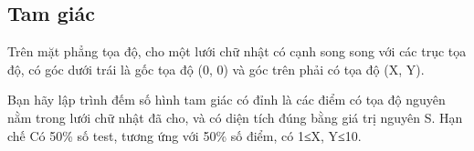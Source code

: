 \subsection{   Tam giác  }

   Trên mặt phẳng tọa độ, cho một lưới chữ nhật có cạnh song song với các trục tọa độ,  có góc dưới   trái là gốc tọa độ (0, 0) và góc trên phải  có tọa độ (X, Y).  

   Bạn hãy lập trình đếm số hình tam giác có đỉnh là các điểm có tọa độ nguyên nằm trong lưới chữ   nhật đã cho, và có diện tích đúng bằng giá trị nguyên S.
   Hạn chế  
Có 50\% số test, tương ứng với 50\% số điểm, có 1≤X, Y≤10.